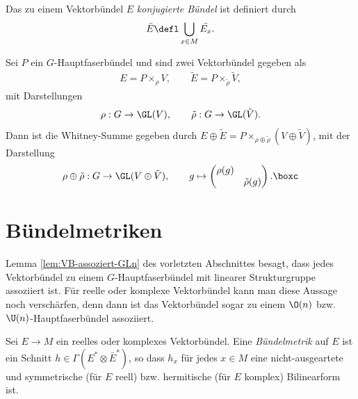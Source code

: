 \documentclass[%
	paper=a5,%
	fleqn,%
	DIV=18,%
	BCOR=0mm,
	fontsize=11pt,
	titlepage=false,%
	bibliography=totoc,
	DIV=18,%
	twoside=true,
	pdftitle=Riemannsche Geometrie,
	pdfauthor=Uwe Semmelmann,
	numbers=noendperiod]%
	{scrbook}
\begin{document}
\begin{defn}
Das zu einem Vektorbündel $E$ \emph{konjugierte Bündel} ist definiert durch
\begin{align*}
\bar{E}\defl\bigcup_{x\in M} \bar{E_x}. 
\end{align*}
\end{defn}


\begin{ex}
Sei $P$ ein $G$-Hauptfaserbündel und sind zwei Vektorbündel gegeben als
\begin{align*}
E = P\times_\rho V,\qquad \tilde{E} = P \times_{\tilde{\rho}} \tilde V,
\end{align*}
mit Darstellungen
\begin{align*}
\rho : G\to \GL(V),\qquad \tilde{\rho}: G\to \GL(\tilde V).
\end{align*}
Dann ist die Whitney-Summe gegeben durch $E\oplus \tilde{E} =
P\times_{\rho\oplus \tilde{\rho}} (V\oplus \tilde V)$, mit der Darstellung
\begin{align*}
\rho\oplus\tilde{\rho} : G\to \GL(V\oplus \tilde V),\qquad 
g\mapsto 
\begin{pmatrix}
\rho(g)\\
& \tilde{\rho}(g)
\end{pmatrix}.\boxc
\end{align*}
\end{ex}


\section{Bündelmetriken}

Lemma \ref{lem:VB-assoziert-GLn} des vorletzten Abschnittes besagt, dass jedes
Vektorbündel zu einem $G$-Hauptfaserbündel mit linearer Strukturgruppe
assoziiert ist. Für reelle oder komplexe Vektorbündel kann man diese Aussage
noch verschärfen, denn dann ist das Vektorbündel sogar zu einem $\O(n)$ bzw.
$\U(n)$-Hauptfaserbündel assoziiert.

\begin{defn}
Sei $E\to M$ ein reelles oder komplexes Vektorbündel. Eine
\emph{Bündelmetrik} auf $E$ ist ein Schnitt $h\in\Gamma(E^*\otimes \bar{E}^*)$,
so dass $h_x$ für jedes $x\in M$ eine nicht-ausgeartete und symmetrische (für
$E$ reell) bzw. hermitische (für $E$ komplex) Bilinearform ist.\fish
\end{defn}
\end{document}

